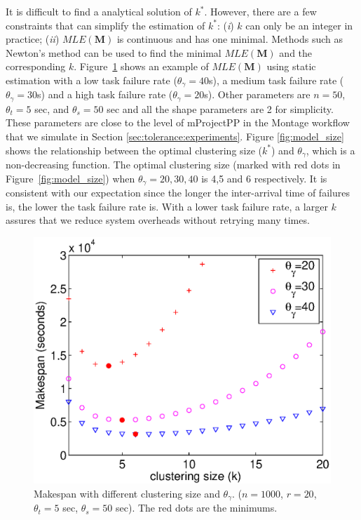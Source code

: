 It is difficult to find a analytical solution of $k^*$. However, there are a few constraints that can simplify the estimation of $k^*$: (\emph{i}) $k$ can only be an integer in practice; (\emph{ii}) $MLE(\bm{M})$ is continuous and has one minimal. Methods such as Newton's method can be used to find the minimal $MLE(\bm{M})$ and the corresponding $k$. Figure~\ref{fig:model_makespan} shows an example of $MLE(\bm{M})$ using static estimation with a low task failure rate ($\theta_{\gamma}=40$s), a medium task failure rate ($\theta_{\gamma}=30$s) and a high task failure rate ($\theta_{\gamma}=20$s). Other parameters are $n=50$, $\theta_{t}=5$ sec, and $\theta_{s}=50$ sec and all the shape parameters are 2 for simplicity. These parameters are close to the level of mProjectPP in the Montage workflow that we simulate in Section \ref{sec:tolerance:experiments}. 
Figure \ref{fig:model_size} shows the relationship between the optimal clustering size ($k^*$) and $\theta_{\gamma}$, which is a non-decreasing function. The optimal clustering size (marked with red dots in Figure~\ref{fig:model_size}) when $\theta_{\gamma}=20,30,40$ is 4,5 and 6 respectively. 
 It is consistent with our expectation since the longer the inter-arrival time of failures is, the lower the task failure rate is. With a lower task failure rate, a larger $k$ assures that we reduce system overheads without retrying many times.  



\begin{figure}[!htb]
\centering
  \includegraphics[width=0.55\linewidth]{figures/tolerance/model_makespan.eps}
  \caption{Makespan with different clustering size and $\theta_{\gamma}$. ($n=1000$, $r=20$, $\theta_t=5$ sec, $\theta_s=50$ sec). The red dots are the minimums. }
  \label{fig:model_makespan}
\end{figure}


